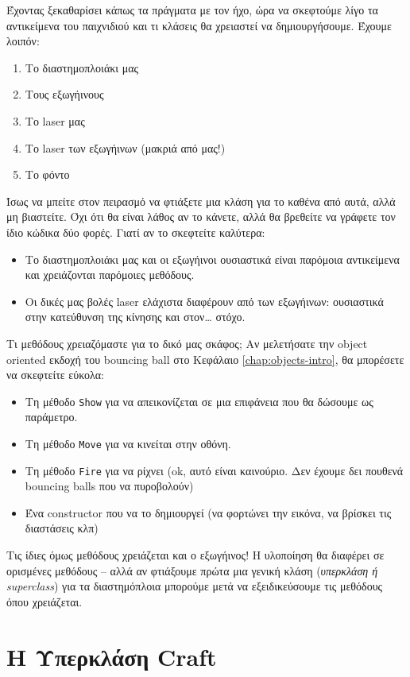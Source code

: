 Έχοντας ξεκαθαρίσει κάπως τα πράγματα με τον ήχο, ώρα να σκεφτούμε λίγο τα αντικείμενα του παιχνιδιού και τι κλάσεις θα χρειαστεί να δημιουργήσουμε. Έχουμε λοιπόν:
%
\begin{enumerate}
\item Το διαστημοπλοιάκι μας
\item Τους εξωγήινους
\item Το laser μας
\item Το laser των εξωγήινων (μακριά από μας!)
\item Το φόντο
\end{enumerate}
%
Ίσως να μπείτε στον πειρασμό να φτιάξετε μια κλάση για το καθένα από αυτά, αλλά μη βιαστείτε. Όχι ότι θα είναι λάθος αν το κάνετε, αλλά θα βρεθείτε να γράφετε τον ίδιο κώδικα δύο φορές.  Γιατί αν το σκεφτείτε καλύτερα:
%
\begin{itemize}
\item Το διαστημοπλοιάκι μας και οι εξωγήινοι ουσιαστικά είναι παρόμοια αντικείμενα και χρειάζονται παρόμοιες μεθόδους.
\item Οι δικές μας βολές laser ελάχιστα διαφέρουν από των εξωγήινων: ουσιαστικά στην κατεύθυνση της κίνησης και στον\ldots{} στόχο.
\end{itemize}
%
Τι μεθόδους χρειαζόμαστε για το δικό μας σκάφος; Αν μελετήσατε την object oriented εκδοχή του bouncing ball στο Κεφάλαιο \ref{chap:objects-intro}, θα μπορέσετε να σκεφτείτε εύκολα:
%
\begin{itemize}
\item Τη μέθοδο {\tt Show} για να απεικονίζεται σε μια επιφάνεια που θα δώσουμε ως παράμετρο.
\item Τη μέθοδο {\tt Move} για να κινείται στην οθόνη.
\item Τη μέθοδο {\tt Fire} για να ρίχνει (ok, αυτό είναι καινούριο. Δεν έχουμε δει πουθενά bouncing balls που να πυροβολούν)
\item Ένα constructor που να το δημιουργεί (να φορτώνει την εικόνα, να βρίσκει τις διαστάσεις κλπ)
\end{itemize}
%
Τις ίδιες όμως μεθόδους χρειάζεται και ο εξωγήινος! Η υλοποίηση θα διαφέρει σε ορισμένες μεθόδους -- αλλά αν φτιάξουμε πρώτα μια γενική κλάση ({\em υπερκλάση ή superclass}) για τα διαστημόπλοια μπορούμε μετά να εξειδικεύσουμε τις μεθόδους όπου χρειάζεται.

\section{Η Υπερκλάση Craft}

